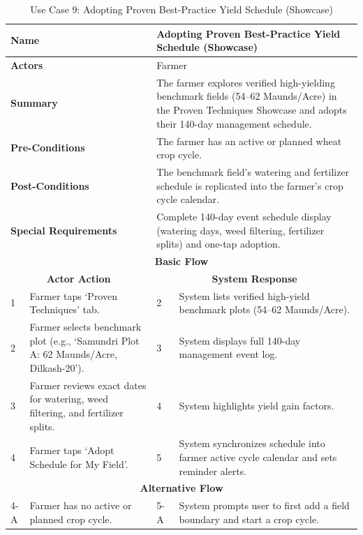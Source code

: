 \begin{table}[H]
\small
\centering
\caption{Use Case 9: Adopting Proven Best-Practice Yield Schedule (Showcase)}
\label{tab:uc9}
\begin{tabular}{|p{0.6cm}|p{6.4cm}|p{0.8cm}|p{6.6cm}|}
\hline
\multicolumn{2}{|p{7.0cm}|}{\textbf{Name}} & \multicolumn{2}{p{7.4cm}|}{Adopting Proven Best-Practice Yield Schedule (Showcase)} \\ \hline
\multicolumn{2}{|p{7.0cm}|}{\textbf{Actors}} & \multicolumn{2}{p{7.4cm}|}{Farmer} \\ \hline
\multicolumn{2}{|p{7.0cm}|}{\textbf{Summary}} & \multicolumn{2}{p{7.4cm}|}{The farmer explores verified high-yielding benchmark fields (54--62 Maunds/Acre) in the Proven Techniques Showcase and adopts their 140-day management schedule.} \\ \hline
\multicolumn{2}{|p{7.0cm}|}{\textbf{Pre-Conditions}} & \multicolumn{2}{p{7.4cm}|}{The farmer has an active or planned wheat crop cycle.} \\ \hline
\multicolumn{2}{|p{7.0cm}|}{\textbf{Post-Conditions}} & \multicolumn{2}{p{7.4cm}|}{The benchmark field's watering and fertilizer schedule is replicated into the farmer's crop cycle calendar.} \\ \hline
\multicolumn{2}{|p{7.0cm}|}{\textbf{Special Requirements}} & \multicolumn{2}{p{7.4cm}|}{Complete 140-day event schedule display (watering days, weed filtering, fertilizer splits) and one-tap adoption.} \\ \hline
\multicolumn{4}{|c|}{\textbf{Basic Flow}} \\ \hline
\multicolumn{2}{|c|}{\textbf{Actor Action}} & \multicolumn{2}{c|}{\textbf{System Response}} \\ \hline
1 & Farmer taps `Proven Techniques' tab. & 2 & System lists verified high-yield benchmark plots (54--62 Maunds/Acre). \\ \hline
2 & Farmer selects benchmark plot (e.g., `Samundri Plot A: 62 Maunds/Acre, Dilkash-20'). & 3 & System displays full 140-day management event log. \\ \hline
3 & Farmer reviews exact dates for watering, weed filtering, and fertilizer splits. & 4 & System highlights yield gain factors. \\ \hline
4 & Farmer taps `Adopt Schedule for My Field'. & 5 & System synchronizes schedule into farmer active cycle calendar and sets reminder alerts. \\ \hline
\multicolumn{4}{|c|}{\textbf{Alternative Flow}} \\ \hline
4-A & Farmer has no active or planned crop cycle. & 5-A & System prompts user to first add a field boundary and start a crop cycle. \\ \hline
\end{tabular}
\end{table}

